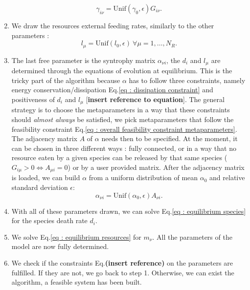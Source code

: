 \documentclass[12pt, titlepage]{report}
\begin{document}
\begin{enumerate}
  \begin{equation}
    \gamma_{i\nu} = \text{Unif}(\gamma_0, \epsilon) G_{i\nu}.
  \end{equation}
  \item We draw the resources external feeding rates, similarly to the other parameters :
  \begin{equation}
  l_\mu = \text{Unif}(l_0, \epsilon) \ \forall \mu=1, \dots, N_R.
  \end{equation}
  \item The last free parameter is the syntrophy matrix $\alpha_{\nu i}$, the $d_i$ and $l_\mu$ are determined through the equations of evolution at equilibrium. This is the tricky part of the algorithm because $\alpha$ has to follow three constraints, namely energy conservation/dissipation Eq.\eqref{eq : dissipation constraint} and positiveness of $d_i$ and $l_\mu$ [\textbf{insert reference to equation}]. The general strategy is to choose the metaparameters in a way that these constraints should \textit{almost always} be satisfied, \ie we pick metaparameters that follow the feasibility constraint Eq.\eqref{eq : overall feasibility constraint metaparameters}. The adjacency matrix $A$ of $\alpha$ needs then to be specified. At the moment, it can be chosen in three different ways : fully connected, or in a way that no resource eaten by a given species can be released by that same species (\ie $G_{i\mu}>0 \iff A_{\mu i}=0$) or by a user provided matrix. After the adjacency matrix is loaded, we can build $\alpha$ from a uniform distribution of mean $\alpha_0$ and relative standard deviation $\epsilon$:
  \begin{equation}
    \alpha_{\nu i} = \text{Unif}(\alpha_0, \epsilon) A_{\nu i} .
  \end{equation}
  \item With all of these parameters drawn, we can solve Eq.\eqref{eq : equilibrium species} for the species death rate $d_i$.
  \item We solve Eq.\eqref{eq : equilibrium resources} for $m_\nu$. All the parameters of the model are now fully determined.
  \item We check if the constraints Eq.\textbf{(insert reference)} on the parameters are fulfilled. If they are not, we go back to step 1. Otherwise, we can exist the algorithm, a feasible system has been built.
\end{enumerate}
\end{document}
